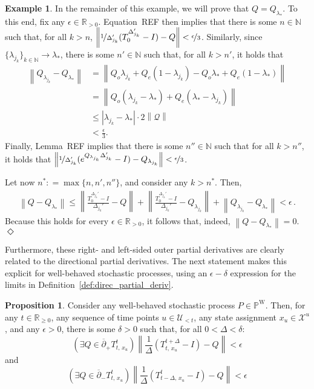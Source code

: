 \documentclass[10pt,a4paper]{paper}
\theoremstyle{definition}
\newtheorem{exmp}{Example}%
\newtheorem{proposition}[theorem]{Proposition}
\newcommand{\nats}{\mathbb{N}}
\newcommand{\reals}{\mathbb{R}}
\newcommand{\realspos}{\reals_{>0}}
\newcommand{\realsnonneg}{\reals_{\geq 0}}
\newcommand{\states}{\mathcal{X}}
\newcommand{\processes}{\mathbb{P}}
\newcommand{\wprocesses}{\processes^{\mathrm{W}}}
\newcommand{\rateset}{\mathcal{Q}}
\newcommand{\norm}[1]{\left\lVert #1 \right\rVert}
\newcommand{\abs}[1]{\left\vert #1 \right\vert}
\newcommand{\coloneqq}{:\!=}
\newcommand{\exampleend}{\hfill$\Diamond$}
\begin{document}
\begin{exmp}
In the remainder of this example, we will prove that $Q=Q_{\lambda_*}$. To this end, fix any $\epsilon\in\realspos$. Equation~REF then implies that there is some $n\in\nats$ such that, for all $k>n$, $\norm{\nicefrac{1}{\Delta_{j_k}'}(T_0^{\Delta_{j_k}'}-I)-Q}<\nicefrac{\epsilon}{3}$. Similarly, since $\{\lambda_{j_k}\}_{k\in\nats}\to\lambda_*$, there is some $n'\in\nats$ such that, for all $k>n'$, it holds that 
\begin{align*}
\norm{Q_{\lambda_{j_k}} - Q_{\lambda_*}} &= \norm{Q_o\lambda_{j_k}+Q_e(1-\lambda_{j_k}) - Q_o\lambda_{*}+Q_e(1-\lambda_{*})} \\
 &= \norm{Q_o(\lambda_{j_k} - \lambda_{*}) + Q_e(\lambda_{*} - \lambda_{j_k})} \\
 &\leq \abs{\lambda_{j_k} - \lambda_{*}}\cdot 2\norm{\rateset} \\
 &< \frac{\epsilon}{3}.
\end{align*}
Finally, Lemma~REF implies that there is some $n''\in\nats$ such that for all $k>n''$, it holds that $\norm{\nicefrac{1}{\Delta_{j_k}'}(e^{Q_{\lambda_{j_k}}\Delta_{j_k}'}-I)-Q_{\lambda_{j_k}}} < \nicefrac{\epsilon}{3}$.

Let now $n^*\coloneqq \max\{n,n',n''\}$, and consider any $k>n^*$. Then,
\begin{align*}
\norm{Q - Q_{\lambda_*}} \leq \norm{\frac{T_0^{\Delta_{j_k}'}-I}{\Delta_{j_k}'}-Q} + \norm{\frac{T_0^{\Delta_{j_k}'}-I}{\Delta_{j_k}'}-Q_{\lambda_{j_k}}} + \norm{Q_{\lambda_{j_k}} - Q_{\lambda_*}} < \epsilon\,.
\end{align*}
Because this holds for every $\epsilon\in\realspos$, it follows that, indeed, $\norm{Q-Q_{\lambda_*}}=0$.
\exampleend
\end{exmp}

\noindent Furthermore, these right- and left-sided outer partial derivatives are clearly related to the directional partial derivatives. The next statement makes this explicit for well-behaved stochastic processes, using an $\epsilon-\delta$ expression for the limits in Definition~\ref{def:direc_partial_deriv}.

\begin{proposition}\label{prop:outerderivativebehaveslikelimit}
Consider any well-behaved stochastic process $P\in\wprocesses$. Then, for any $t\in\realsnonneg$, any sequence of time points $u\in\mathcal{U}_{<t}$, any state assignment $x_u\in\states^u$, and any $\epsilon>0$, there is some $\delta>0$ such that, for all $0<\Delta<\delta$:
\begin{equation}
\label{eq:outerderivativebehaveslikelimit1}
(\exists Q\in\overline{\partial}_{+}
{T^t_{t,\,x_u}})
\norm{\frac{1}{\Delta}
(T^{t+\Delta}_{t,\,x_u}-I)-Q}<\epsilon
\end{equation}
and
\begin{equation}
\label{eq:outerderivativebehaveslikelimit2}
(\exists Q\in\overline{\partial}_{-}
{T^t_{t,\,x_u}})
\norm{\frac{1}{\Delta}
(T^{t}_{t-\Delta,\,x_u}-I)-Q}<\epsilon
\end{equation}
\end{proposition}
\end{document}
